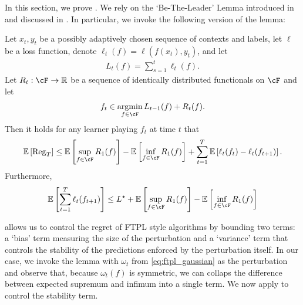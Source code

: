 
In this section, we prove .  
We rely on the `Be-The-Leader' Lemma introduced in \citet{kalai2005efficient} and discussed in \citet{cesa2006prediction}.  In particular, we invoke the following version of the lemma:
\begin{lemma}\label{lem:btl}
    Let $x_t, y_t$ be a possibly adaptively chosen sequence of contexts and labels, let $\ell$ be a loss function, denote $\ell_t(f) = \ell(f(x_t), y_t)$, and let 
    \begin{align}
        L_t(f) = \sum_{s = 1}^t \ell_t(f).
    \end{align}
    Let $R_t: \cF \to \rr$ be a sequence of identically distributed functionals on $\cF$ and let
    \begin{align}
        f_t \in \argmin_{f \in \cF} L_{t-1}(f) + R_t(f).
    \end{align}
    Then it holds for any learner playing $f_t$ at time $t$ that
    \begin{align}
        \ee\left[ \reg_T \right] \leq \ee\left[ \sup_{f \in \cF} R_1(f) \right] - \ee\left[ \inf_{f \in \cF} R_1(f) \right] + \sum_{t = 1}^T \ee\left[ \ell_t(f_t) - \ell_t(f_{t+1}) \right].
    \end{align}
    Furthermore,
    \begin{align}
        \ee\left[ \sum_{t = 1}^T \ell_t(f_{t+1}) \right] \leq \Lstar + \ee\left[ \sup_{f \in \cF} R_1(f) \right] - \ee\left[ \inf_{f \in \cF} R_1(f) \right]
    \end{align}
\end{lemma}
 allows us to control the regret of FTPL style algorithms by bounding two terms: a `bias' term measuring the size of the perturbation and a `variance' term that controls the stability of the predictions enforced by the perturbation itself.  In our case, we invoke the lemma with $
\omega_t$ from \eqref{eq:ftpl_gaussian} as the perturbation and observe that, because $\omega_t(f)$ is symmetric, we can collaps the difference between expected supremum and infimum into a single term.  We now apply  to control the stability term.

